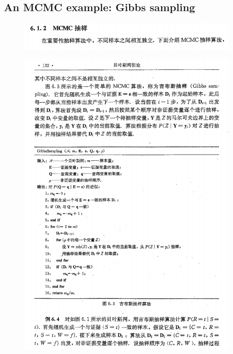 \documentclass{article}
\begin{document}
\subsection{An MCMC example: Gibbs sampling}
\begin{figure}[h]
    \centering
    \includegraphics[width=1.05\columnwidth]{figs/mcmc1.png}
\end{figure}
\begin{figure}[h]
    \centering
    \includegraphics[width=1.05\columnwidth]{figs/mcmc2.png}
\end{figure}
\end{document}
